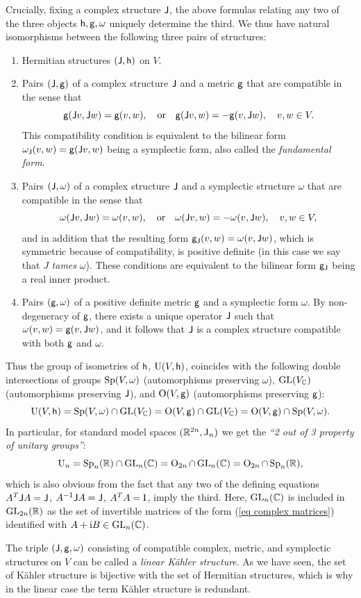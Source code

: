\begin{example}
    Crucially, fixing a complex structure $\mathsf{J}$, the above formulas relating any two of the three objects $\mathsf{h},\mathsf{g},\omega$ uniquely determine the third. We thus have natural isomorphisms between the following three pairs of structures:
    \begin{enumerate}
        \item Hermitian structures $(\mathsf{J},\mathsf{h})$ on $V$.
        \item Pairs $(\mathsf{J},\mathsf{g})$ of a complex structure $\mathsf{J}$ and a metric $\mathsf{g}$ that are compatible in the sense that
        \[\mathsf{g}(\mathsf{J} v,\mathsf{J} w)=\mathsf{g}(v,w),\quad \text{or}\quad \mathsf{g}(\mathsf{J} v,w)=-\mathsf{g}(v,\mathsf{J} w),\quad v,w\in V.\]
        This compatibility condition is equivalent to the bilinear form $\omega_{\mathsf{J}}(v,w)=\mathsf{g}(\mathsf{J} v,w)$ being a symplectic form, also called the \emph{fundamental form}.
        \item Pairs $(\mathsf{J},\omega)$ of a complex structure $\mathsf{J}$ and a symplectic structure $\omega$ that are compatible in the sense that
        \[\omega(\mathsf{J} v,\mathsf{J} w)=\omega(v,w),\quad \text{or}\quad \omega(\mathsf{J} v,w)=-\omega(v,\mathsf{J} w),\quad v,w\in V,\]
        and in addition that the resulting form $\mathsf{g}_{\mathsf{J}}(v,w)=\omega(v,\mathsf{J} w)$, which is symmetric because of compatibility, is positive definite (in this case we say that $J$ \emph{tames} $\omega$). These conditions are equivalent to the bilinear form $\mathsf{g}_{\mathsf{J}}$ being a real inner product.
        \item Pairs $(\mathsf{g},\omega)$ of a positive definite metric $\mathsf{g}$ and a symplectic form $\omega$. By non-degeneracy of $\mathsf{g}$, there exists a unique operator $\mathsf{J}$ such that $\omega(v,w)=\mathsf{g}(v,\mathsf{J} w)$, and it follows that $\mathsf{J}$ is a complex structure compatible with both $\mathsf{g}$ and $\omega$.
    \end{enumerate}
    Thus the group of isometries of $\mathsf{h}$, $\operatorname{U}(V,\mathsf{h})$, coincides with the following double intersections of groups $\operatorname{Sp}(V,\omega)$ (automorphisms preserving $\omega$), $\operatorname{GL}(V_{\mathbb{C}})$ (automorphisms preserving $\mathsf{J}$), and $\operatorname{O}(V,\mathsf{g})$ (automorphisms preserving $\mathsf{g}$):
    \[\operatorname{U}(V,\mathsf{h})=\operatorname{Sp}(V,\omega)\cap \operatorname{GL}(V_{\mathbb{C}})=\operatorname{O}(V,\mathsf{g})\cap \operatorname{GL}(V_{\mathbb{C}})=\operatorname{O}(V,\mathsf{g})\cap \operatorname{Sp}(V,\omega).\]
    In particular, for standard model spaces $(\mathbb{R}^{2n},\mathrm{J}_{n})$ we get the \emph{``2 out of 3 property of unitary groups''}:
    \[\operatorname{U}_n=\operatorname{Sp}_n(\mathbb{R})\cap \operatorname{GL}_n(\mathbb{C})=\operatorname{O}_{2n}\cap \operatorname{GL}_n(\mathbb{C})=\operatorname{O}_{2n}\cap \operatorname{Sp}_n(\mathbb{R}),\]
    which is also obvious from the fact that any two of the defining equations $A^T\mathsf{J} A=\mathsf{J}$, $A^{-1}\mathsf{J} A= \mathsf{J}$, $A^TA=\mathrm{I}$, imply the third.
    Here, $\operatorname{GL}_n(\mathbb{C})$ is included in $\operatorname{GL}_{2n}(\mathbb{R})$ as the set of invertible matrices of the form (\ref{eq complex matrices}) identified with $A+\mathrm{i} B\in \operatorname{GL}_n(\mathbb{C})$.
    
    The triple $(\mathsf{J},\mathsf{g},\omega)$ consisting of compatible complex, metric, and symplectic structures on $V$ can be called a \emph{linear K\"ahler structure}. As we have seen, the set of K\"ahler structure is bijective with the set of Hermitian structures, which is why in the linear case the term K\"ahler structure is redundant.
\end{example}

